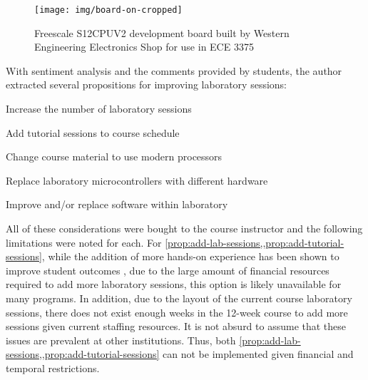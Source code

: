 \begin{figure}[bh!]
    \centering
    \texttt{[image: img/board-on-cropped]}
    \caption{Freescale S12CPUV2 development board built by Western Engineering Electronics Shop for use in ECE 3375}
    \label{fig:hc12-board}
\end{figure}

With sentiment analysis and the comments provided by students, the author extracted several propositions for improving laboratory sessions: 

\begin{propositions}%
    \item Increase the number of laboratory sessions 
        \label{prop:add-lab-sessions}
    \item Add tutorial sessions to course schedule
        \label{prop:add-tutorial-sessions}
    \item Change course material to use modern processors
        \label{prop:change-course-materials}
    \item Replace laboratory microcontrollers with different hardware
        \label{prop:replace-hardware} %
    \item Improve and/or replace software within laboratory
        \label{prop:replace-software}
\end{propositions}

All of these considerations were bought to the course instructor and the following limitations were noted for each. For \cref{prop:add-lab-sessions,,prop:add-tutorial-sessions}, while the addition of more hands-on experience has been shown to improve student outcomes \cite{Ristov2011, Stolikj2011}, due to the large amount of financial resources required to add more laboratory sessions, this option is likely unavailable for many programs. In addition, due to the layout of the current course laboratory sessions, there does not exist enough weeks in the 12-week course to add more sessions given current staffing resources. It is not absurd to assume that these issues are prevalent at other institutions. Thus, both \cref{prop:add-lab-sessions,,prop:add-tutorial-sessions} can not be implemented given financial and temporal restrictions.

